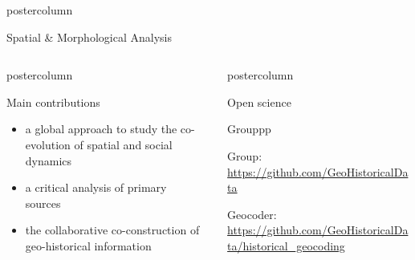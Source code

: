\documentclass[final,hyperref={pdfpagelabels=false}]{beamer}
\let\oldcite=\cite
\renewcommand{\cite}[1]{\textcolor{ta3chameleon}{\oldcite{#1}}}
\begin{document}
\begin{frame}
\begin{columns}
\begin{column}{0.5\textwidth}
\begin{beamercolorbox}[center,wd=\textwidth]{postercolumn}
\begin{minipage}[t]{.98\textwidth}
\begin{block}{Spatial \& Morphological Analysis}
      \end{block}
    \end{minipage}
    \end{beamercolorbox}
    \end{column}
  \end{columns}
  \begin{columns}
    \begin{column}{0.6\textwidth}
    \begin{beamercolorbox}[center,wd=\textwidth]{postercolumn}
    \begin{minipage}[t]{.98\textwidth}
      \begin{block}{Main contributions}%
        \tiny
        \begin{itemize}
        \item a \textcolor{ta3orange}{global approach} to study the co-evolution of spatial and social dynamics~\cite{Dumenieu2013a, Dumenieu2015PhD}
        \item a \textcolor{ta3orange}{critical analysis} of \textcolor{ta3orange}{primary sources}~\cite{Costes2015_, Dumenieu2015PhD, Costes2016PhD, Dumenieu2018}
        \item the \textcolor{ta3orange}{collaborative co-construction} of geo-historical information~\cite{Perret2015_, Perret2015Data_, Cura2018}
        \end{itemize}
      \end{block}
    \end{minipage}
    \end{beamercolorbox}
    \end{column}
    \begin{column}{0.4\textwidth}
      \begin{beamercolorbox}[center,wd=\textwidth]{postercolumn}
        \begin{minipage}[t]{.98\textwidth}
          \begin{block}{Open science}
            \begin{Mdescription}{Grouppp}
              \tiny
            \item[\textcolor{ta3orange}{Group:}] \url{https://github.com/GeoHistoricalData}\\
            \item[\textcolor{ta3orange}{Geocoder:}] \url{https://github.com/GeoHistoricalData/historical_geocoding}\\

\end{Mdescription}
\end{block}
\end{minipage}
\end{beamercolorbox}
\end{column}
\end{columns}
\end{frame}
\end{document}
